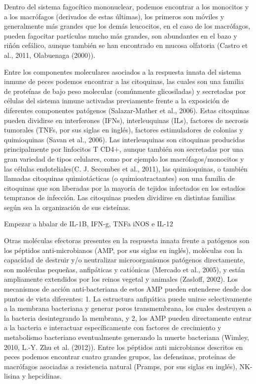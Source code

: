 \documentclass[11pt,a4paper,]{article}
\begin{document}
Dentro del sistema fagocítico mononuclear, podemos encontrar a los
monocitos y a los macrófagos (derivados de estas últimas), los primeros
son móviles y generalmente más grandes que los demás leucocitos, en el
caso de los macrófagos, pueden fagocitar partículas mucho más grandes,
son abundantes en el bazo y riñón cefálico, aunque también se han
encontrado en mucosa olfatoria (Castro et al., 2011, Olabuenaga (2000)).

Entre los componentes moleculares asociados a la respuesta innata del
sistema inmune de peces podemos encontrar a las citoquinas, las cuales
son una familia de proteínas de bajo peso molecular (comúnmente
glicosiladas) y secretadas por células del sistema inmune activadas
previamente frente a la exposición de diferentes componentes patógenos
(Salazar-Mather et al., 2006)⁠. Estas citoquinas pueden dividirse en
interferones (IFNs), interleuquinas (ILs), factores de necrosis
tumorales (TNFs, por sus siglas en inglés), factores estimuladores de
colonias y quimioquinas (Savan et al., 2006)⁠. Las interleuquinas son
citoquinas producidas principalmente por linfocitos T CD4+, aunque
también son secretadas por una gran variedad de tipos celulares, como
por ejemplo los macrófagos/monocitos y las células endoteliales(C. J.
Secombes et al., 2011), las quimioquinas, o también llamadas citoquinas
quimiotácticas (o quimioatractantes) son una familia de citoquinas que
son liberadas por la mayoría de tejidos infectados en los estadíos
tempranos de infección. Las citoquinas pueden dividirse en distintas
familias según sea la organización de sus cisteínas.

Empezar a hbalar de IL-1B, IFN-g, TNFa iNOS e IL-12

\pagebreak

Otras moléculas efectoras presentes en la respuesta innata frente a
patógenos son los péptidos anti-microbianos (AMP, por sus siglas en
inglés), moléculas con la capacidad de destruir y/o neutralizar
microorganismos patógenos directamente, son moléculas pequeñas,
anfipáticas y catiónicas (Mercado et al., 2005)⁠, y están ampliamente
extendidos por los reinos vegetal y animales (Zasloff, 2002). Los
mecanismos de acción anti-bacteriana de estos AMP pueden entenderse
desde dos puntos de vista diferentes: 1. La estructura anfipática puede
unirse selectivamente a la membrana bacteriana y generar poros
transmembrana, los cuales destruyen a la bacteria desintegrando la
membrana, y 2, los AMP pueden directamente entrar a la bacteria e
interactuar específicamente con factores de crecimiento y metabolismo
bacteriano eventualmente generando la muerte bacteriana (Wimley, 2010,
L.-Y. Zhu et al. (2012))⁠. Entre los péptidos anti microbianos descritos
en peces podemos encontrar cuatro grandes grupos, las defensinas,
proteínas de macrófagos asociadas a resistencia natural (Pramps, por sus
siglas en inglés), NK-lisina y hepcidinas.
\end{document}
